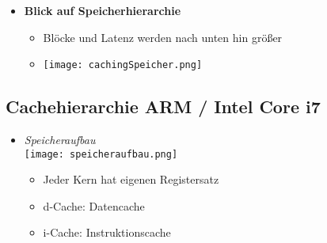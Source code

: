 \begin{itemize}
        \item \textbf{Blick auf Speicherhierarchie}
            \begin{itemize}
                \item[] Blöcke und Latenz werden nach unten hin größer
                \item[] \texttt{[image: cachingSpeicher.png]} 
            \end{itemize}
    \end{itemize}

\subsection{Cachehierarchie ARM / Intel Core i7 }

    \begin{itemize}
        \item[]
            \begin{minipage}{0.4\textwidth}
                \textit{Speicheraufbau} \\
                \texttt{[image: speicheraufbau.png]}
            \end{minipage}
            \begin{minipage}{0.45\textwidth}
                \begin{itemize}
                    \item Jeder Kern hat eigenen Registersatz
                    \item d-Cache: Datencache
                    \item i-Cache: Instruktionscache
                \end{itemize}
            \end{minipage}
    \end{itemize}
